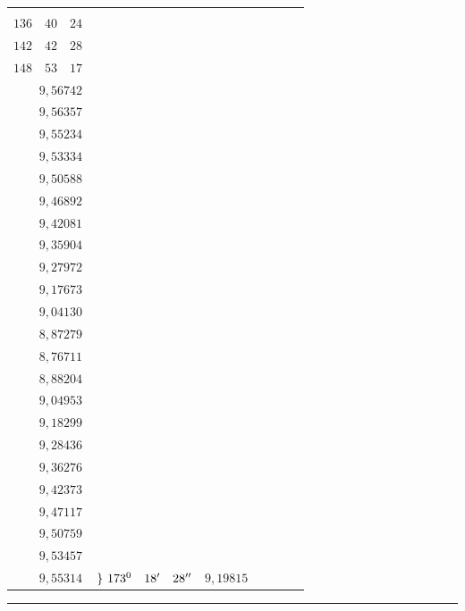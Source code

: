 \begin{landscape}
\begin{center}
\begin{tabular}{r|r|r|r|r|r|r}
{\(130\quad 52\quad 18\) \\
\(136\quad 40\quad 24\) \\
\(142\quad 42\quad 28\) \\
\(148\quad 53\quad 17\)
}
&
\GaussVIIcolumn{
\(9{,}56396\) \\
\(9{,}56742\) \\
\(9{,}56357\) \\
\(9{,}55234\) \\[3pt]
\(9{,}53334\) \\
\(9{,}50588\) \\
\(9{,}46892\) \\
\(9{,}42081\) \\[3pt]
\(9{,}35904\) \\
\(9{,}27972\) \\
\(9{,}17673\) \\
\(9{,}04130\) \\[3pt]
\(8{,}87279\) \\
\(8{,}76711\) \\
\(8{,}88204\) \\
\(9{,}04953\) \\[3pt]
\(9{,}18299\) \\
\(9{,}28436\) \\
\(9{,}36276\) \\
\(9{,}42373\) \\[3pt]
\(9{,}47117\) \\
\(9{,}50759\) \\
\(9{,}53457\) \\
\(9{,}55314\)
}
&
\(\left.\vphantom{\copy0}\right\}\,173^0\quad 18'\quad 28''\)
& \(9{,}19815\) \\
\end{tabular}
\par\medskip
\rule{8em}{0.3pt}
\end{center}
\endgroup
\end{landscape}
\clearpage
\endgroup
